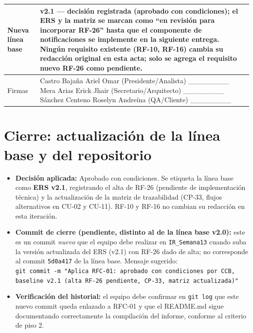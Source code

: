 \documentclass[11pt,a4paper]{article}
\begin{document}
\begin{longtable}{|p{4.5cm}|p{10cm}|}
Nueva línea base & \textbf{v2.1} — decisión registrada (aprobado con condiciones); el ERS y la matriz se marcan como ``en revisión para incorporar RF-26'' hasta que el componente de notificaciones se implemente en la siguiente entrega. Ningún requisito existente (RF-10, RF-16) cambia su redacción original en esta acta; solo se agrega el requisito nuevo RF-26 como pendiente. \\ \hline
Firmas & Castro Bajaña Ariel Omar (Presidente/Analista) \_\_\_\_\_\_\_\_ \quad Mera Arias Erick Jhair (Secretario/Arquitecto) \_\_\_\_\_\_\_\_ \quad Sánchez Centeno Roselyn Andreína (QA/Cliente) \_\_\_\_\_\_\_\_ \\ \hline
\end{longtable}

\section{Cierre: actualización de la línea base y del repositorio}

\begin{itemize}
\item \textbf{Decisión aplicada:} Aprobado con condiciones. Se etiqueta la línea base como \textbf{ERS v2.1}, registrando el alta de RF-26 (pendiente de implementación técnica) y la actualización de la matriz de trazabilidad (CP-33, flujos alternativos en CU-02 y CU-11). RF-10 y RF-16 no cambian su redacción en esta iteración.
\item \textbf{Commit de cierre (pendiente, distinto al de la línea base v2.0):} este es un commit \emph{nuevo} que el equipo debe realizar en \texttt{IR\_Semana13} cuando suba la versión actualizada del ERS (v2.1) con RF-26 dado de alta; no corresponde al commit \texttt{5d0a417} de la línea base. Mensaje sugerido: \\
\texttt{git commit -m "Aplica RFC-01: aprobado con condiciones por CCB, baseline v2.1 (alta RF-26 pendiente, CP-33, matriz actualizada)"}
\item \textbf{Verificación del historial:} el equipo debe confirmar en \texttt{git log} que este nuevo commit queda enlazado a RFC-01 y que el README.md sigue documentando correctamente la compilación del informe, conforme al criterio de piso 2.
\end{itemize}

\end{document}
